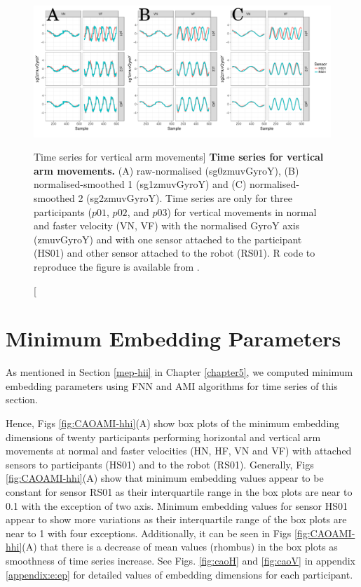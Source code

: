 \begin{figure}[!h]
  \centering
\includegraphics[width=1.0\textwidth]{tsVv03}
	\caption
	[Time series for vertical arm movements]{
	{\bf Time series for vertical arm movements.}
		(A) raw-normalised (sg0zmuvGyroY), 
		(B) normalised-smoothed 1 (sg1zmuvGyroY) and
		(C) normalised-smoothed 2 (sg2zmuvGyroY).
		Time series are only for three participants 
		($p01$, $p02$, and $p03$) 
		for vertical movements in normal and faster velocity (VN, VF) 
		with the normalised GyroY axis (zmuvGyroY) 
		and with one sensor attached to the participant (HS01) 
		and other sensor attached to the robot (RS01).
		R code to reproduce the figure is available 
		from \cite{hwum2018}.
        }
    \label{fig:tsV}
\end{figure}







\section{Minimum Embedding Parameters}
As mentioned in Section \ref{mep-hii} in Chapter \ref{chapter5}, 
we computed minimum embedding parameters using FNN and AMI algorithms
for time series of this section.

Hence, Figs \ref{fig:CAOAMI-hhi}(A) show box plots of the minimum embedding 
dimensions of twenty participants performing horizontal and vertical arm
movements at normal and faster velocities (HN, HF, VN and VF) with 
attached sensors to participants (HS01) and to the robot (RS01).
Generally, Figs \ref{fig:CAOAMI-hhi}(A) show that minimum embedding values 
appear to be constant for sensor RS01 as their interquartile range 
in the box plots are near to 0.1 with the exception of two axis. 
Minimum embedding values for sensor HS01 appear to show more variations 
as their interquartile range of the box plots are near to 1 
with four exceptions.
Additionally, it can be seen in Figs \ref{fig:CAOAMI-hhi}(A) that there is a 
decrease of mean values (rhombus) in the box plots
as smoothness of time series increase. 
See Figs. \ref{fig:caoH} and \ref{fig:caoV} in appendix \ref{appendix:e:ep} 
for detailed values of embedding dimensions for each participant.

